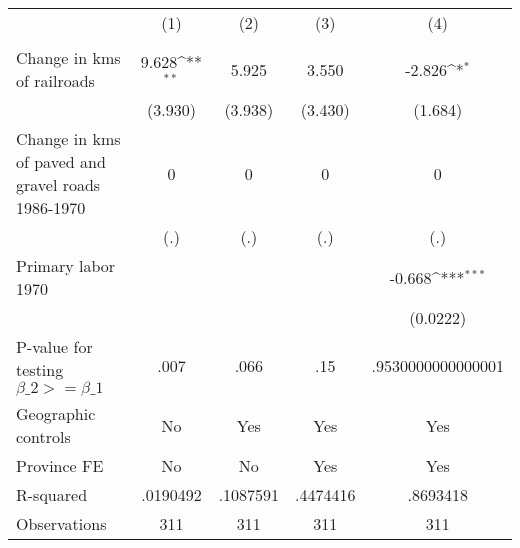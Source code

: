 {
\def\sym#1{\ifmmode^{#1}\else\(^{#1}\)\fi}
\begin{tabular}{l*{4}{c}}
\hline\hline
                &\multicolumn{1}{c}{(1)}&\multicolumn{1}{c}{(2)}&\multicolumn{1}{c}{(3)}&\multicolumn{1}{c}{(4)}\\
                &\multicolumn{1}{c}{}&\multicolumn{1}{c}{}&\multicolumn{1}{c}{}&\multicolumn{1}{c}{}\\
\hline
Change in kms of railroads&    9.628\sym{**} &    5.925         &    3.550         &   -2.826\sym{*}  \\
                &  (3.930)         &  (3.938)         &  (3.430)         &  (1.684)         \\
[1em]
Change in kms of paved and gravel roads 1986-1970&        0         &        0         &        0         &        0         \\
                &      (.)         &      (.)         &      (.)         &      (.)         \\
[1em]
Primary labor 1970&                  &                  &                  &   -0.668\sym{***}\\
                &                  &                  &                  & (0.0222)         \\
\hline
P-value for testing $\beta\_{2} >= \beta\_{1}$&     .007         &     .066         &      .15         &.9530000000000001         \\
Geographic controls&       No         &      Yes         &      Yes         &      Yes         \\
Province FE     &       No         &       No         &      Yes         &      Yes         \\
R-squared       & .0190492         & .1087591         & .4474416         & .8693418         \\
Observations    &      311         &      311         &      311         &      311         \\
\hline\hline
\end{tabular}
}
